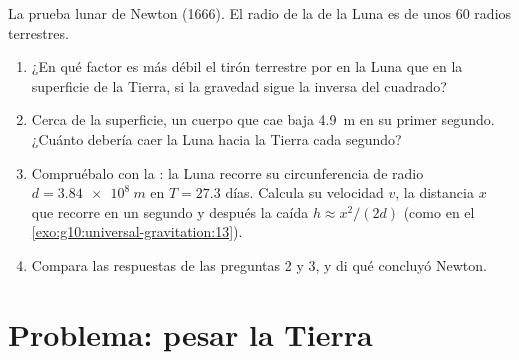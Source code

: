 \begin{exercise}[$\star\star\star$]\label{exo:g10:universal-gravitation:15}
La prueba lunar de Newton (1666). El radio de la  de la Luna es de
unos $60$ radios terrestres.
\begin{enumerate}
  \item ¿En qué factor es más débil el tirón terrestre por  en
        la Luna que en la superficie de la Tierra, si la gravedad sigue
        la inversa del cuadrado?
  \item Cerca de la superficie, un cuerpo que cae baja \qty{4.9}{m} en
        su primer segundo. ¿Cuánto debería caer la Luna hacia la Tierra
        cada segundo?
  \item Compruébalo con la : la Luna recorre su circunferencia de
        radio $d = \qty{3.84e8}{m}$ en $T = 27.3$ días. Calcula su
        velocidad $v$, la distancia $x$ que recorre en un segundo y
        después la caída $h \approx x^2/(2d)$ (como en el
        \cref{exo:g10:universal-gravitation:13}).
  \item Compara las respuestas de las preguntas 2 y 3, y di qué concluyó
        Newton.
\end{enumerate}
\end{exercise}

\section{Problema: pesar la Tierra}

